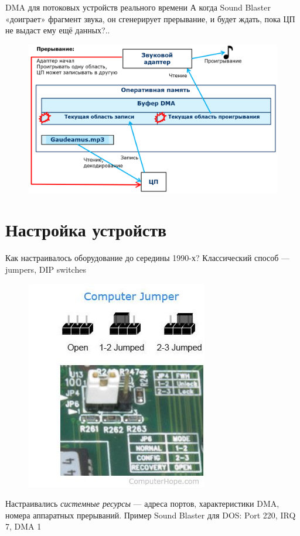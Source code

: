 \documentclass[xetex,aspectratio=43]{beamer}
\begin{document}
\begin{frame}{DMA для потоковых устройств реального времени}
	А когда Sound Blaster «доиграет» фрагмент звука, он сгенерирует
	прерывание, и будет ждать, пока ЦП не выдаст ему ещё данных?..

	\pause

    \begin{figure}
    	\includegraphics[height=0.65\textheight]{img/03.interrupt_DMA.png}
    \end{figure}

\end{frame}

\section{Настройка устройств}

\begin{frame}{Как настраивалось оборудование до середины 1990-х?}
	Классический способ --- jumpers, DIP switches

	\begin{figure}
		\centering
		\includegraphics[height=0.5\textheight]{img/03.jumper.jpg}
	\end{figure}

	Настраивались \emph{системные ресурсы} --- адреса портов, характеристики DMA, номера аппаратных прерываний. Пример Sound Blaster для DOS: Port 220, IRQ 7, DMA 1
\end{frame}
\end{document}
